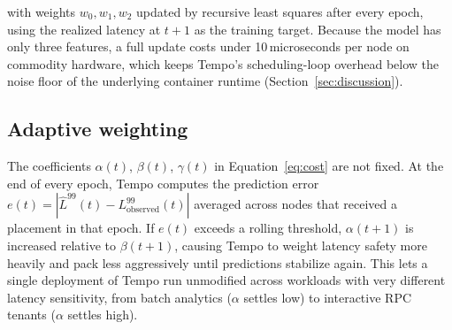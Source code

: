 with weights $w_0, w_1, w_2$ updated by recursive least squares after every
epoch, using the realized latency at $t+1$ as the training target. Because
the model has only three features, a full update costs under
10\,microseconds per node on commodity hardware, which keeps Tempo's
scheduling-loop overhead below the noise floor of the underlying container
runtime (Section~\ref{sec:discussion}).

\subsection{Adaptive weighting}

The coefficients $\alpha(t)$, $\beta(t)$, $\gamma(t)$ in
Equation~\ref{eq:cost} are not fixed. At the end of every epoch, Tempo
computes the prediction error $e(t) = |\hat{L}^{99}(t) - L^{99}_{\text{observed}}(t)|$
averaged across nodes that received a placement in that epoch. If $e(t)$
exceeds a rolling threshold, $\alpha(t{+}1)$ is increased relative to
$\beta(t{+}1)$, causing Tempo to weight latency safety more heavily and pack
less aggressively until predictions stabilize again. This lets a single
deployment of Tempo run unmodified across workloads with very different
latency sensitivity, from batch analytics ($\alpha$ settles low) to
interactive RPC tenants ($\alpha$ settles high).
